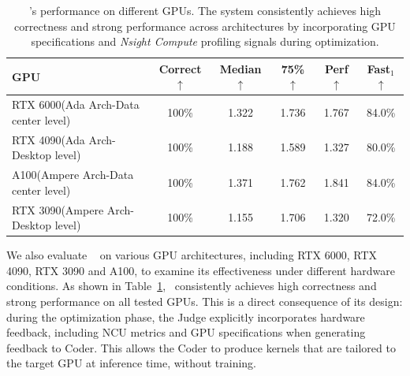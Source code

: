 \begin{table}[t]
\caption{\agentname's performance on different GPUs. The system consistently achieves high correctness and strong performance across architectures by incorporating GPU specifications and \textit{Nsight Compute} profiling signals during optimization.}
\label{tab:cross_gpu}
\centering
\begin{tabular}{lccccc}
\toprule
\textbf{GPU} & \textbf{Correct$\uparrow$} & \textbf{Median $\uparrow$}  & \textbf{75\% $\uparrow$}  & \textbf{Perf $\uparrow$}  & \textbf{Fast$_1$$\uparrow$} \\
\midrule
RTX 6000(Ada Arch-Data center level)   & 100\% &  1.322 & 1.736 & 1.767 & 84.0\% \\
RTX 4090(Ada Arch-Desktop level)  & 100\% & 1.188 & 1.589 & 1.327 & 80.0\% \\
A100(Ampere Arch-Data center level)  & 100\% & 1.371& 1.762 & 1.841 & 84.0\% \\
RTX 3090(Ampere Arch-Desktop level)  & 100\% & 1.155& 1.706 & 1.320 & 72.0\% \\
\bottomrule
\end{tabular}
\end{table}
We also evaluate \agentname~ on various GPU architectures, including RTX 6000, RTX 4090, RTX 3090 and A100, to examine its effectiveness under different hardware conditions.  
As shown in Table~\ref{tab:cross_gpu}, \agentname
~consistently achieves high correctness and strong performance on all tested GPUs. This is a direct consequence of its design: during the optimization phase, the Judge explicitly incorporates hardware feedback, including NCU metrics and GPU specifications when generating feedback to Coder. This allows the Coder to produce kernels that are tailored to the target GPU at inference time, without training.

